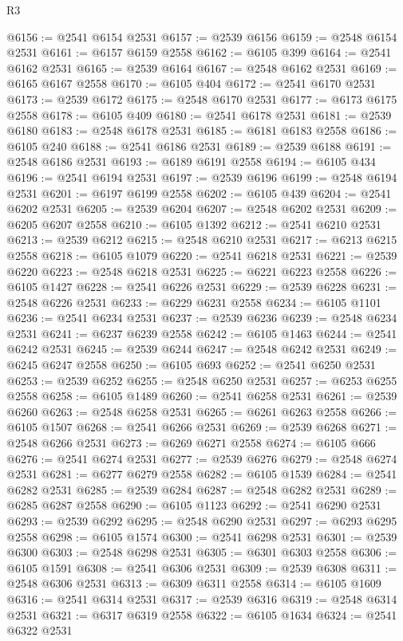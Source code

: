 \begin{lexlean}{R3}
\begin{coremodule}
@6156 := @2541 @6154 @2531
@6157 := @2539 @6156
@6159 := @2548 @6154 @2531
@6161 := @6157 @6159 @2558
@6162 := @6105 @399
@6164 := @2541 @6162 @2531
@6165 := @2539 @6164
@6167 := @2548 @6162 @2531
@6169 := @6165 @6167 @2558
@6170 := @6105 @404
@6172 := @2541 @6170 @2531
@6173 := @2539 @6172
@6175 := @2548 @6170 @2531
@6177 := @6173 @6175 @2558
@6178 := @6105 @409
@6180 := @2541 @6178 @2531
@6181 := @2539 @6180
@6183 := @2548 @6178 @2531
@6185 := @6181 @6183 @2558
@6186 := @6105 @240
@6188 := @2541 @6186 @2531
@6189 := @2539 @6188
@6191 := @2548 @6186 @2531
@6193 := @6189 @6191 @2558
@6194 := @6105 @434
@6196 := @2541 @6194 @2531
@6197 := @2539 @6196
@6199 := @2548 @6194 @2531
@6201 := @6197 @6199 @2558
@6202 := @6105 @439
@6204 := @2541 @6202 @2531
@6205 := @2539 @6204
@6207 := @2548 @6202 @2531
@6209 := @6205 @6207 @2558
@6210 := @6105 @1392
@6212 := @2541 @6210 @2531
@6213 := @2539 @6212
@6215 := @2548 @6210 @2531
@6217 := @6213 @6215 @2558
@6218 := @6105 @1079
@6220 := @2541 @6218 @2531
@6221 := @2539 @6220
@6223 := @2548 @6218 @2531
@6225 := @6221 @6223 @2558
@6226 := @6105 @1427
@6228 := @2541 @6226 @2531
@6229 := @2539 @6228
@6231 := @2548 @6226 @2531
@6233 := @6229 @6231 @2558
@6234 := @6105 @1101
@6236 := @2541 @6234 @2531
@6237 := @2539 @6236
@6239 := @2548 @6234 @2531
@6241 := @6237 @6239 @2558
@6242 := @6105 @1463
@6244 := @2541 @6242 @2531
@6245 := @2539 @6244
@6247 := @2548 @6242 @2531
@6249 := @6245 @6247 @2558
@6250 := @6105 @693
@6252 := @2541 @6250 @2531
@6253 := @2539 @6252
@6255 := @2548 @6250 @2531
@6257 := @6253 @6255 @2558
@6258 := @6105 @1489
@6260 := @2541 @6258 @2531
@6261 := @2539 @6260
@6263 := @2548 @6258 @2531
@6265 := @6261 @6263 @2558
@6266 := @6105 @1507
@6268 := @2541 @6266 @2531
@6269 := @2539 @6268
@6271 := @2548 @6266 @2531
@6273 := @6269 @6271 @2558
@6274 := @6105 @666
@6276 := @2541 @6274 @2531
@6277 := @2539 @6276
@6279 := @2548 @6274 @2531
@6281 := @6277 @6279 @2558
@6282 := @6105 @1539
@6284 := @2541 @6282 @2531
@6285 := @2539 @6284
@6287 := @2548 @6282 @2531
@6289 := @6285 @6287 @2558
@6290 := @6105 @1123
@6292 := @2541 @6290 @2531
@6293 := @2539 @6292
@6295 := @2548 @6290 @2531
@6297 := @6293 @6295 @2558
@6298 := @6105 @1574
@6300 := @2541 @6298 @2531
@6301 := @2539 @6300
@6303 := @2548 @6298 @2531
@6305 := @6301 @6303 @2558
@6306 := @6105 @1591
@6308 := @2541 @6306 @2531
@6309 := @2539 @6308
@6311 := @2548 @6306 @2531
@6313 := @6309 @6311 @2558
@6314 := @6105 @1609
@6316 := @2541 @6314 @2531
@6317 := @2539 @6316
@6319 := @2548 @6314 @2531
@6321 := @6317 @6319 @2558
@6322 := @6105 @1634
@6324 := @2541 @6322 @2531

\end{coremodule}
\end{lexlean}
